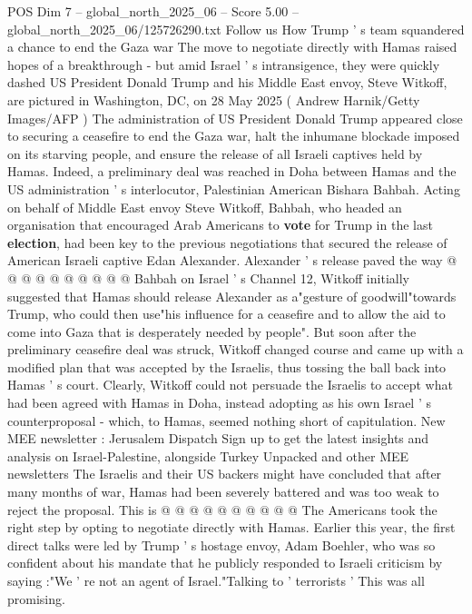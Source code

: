 \begin{textsample}{POS Dim 7 – global\_north\_2025\_06 – Score 5.00 – global\_north\_2025\_06/125726290.txt}  \label{ex:f7_pos_383}
Follow us How Trump ' s team squandered a chance to end the Gaza war The move to negotiate directly with Hamas raised hopes of a breakthrough - but amid Israel ' s intransigence, they were quickly dashed US President Donald Trump and his Middle East envoy, Steve Witkoff, are pictured in Washington, DC, on 28 May 2025 ( Andrew Harnik/Getty Images/AFP ) The administration of US President Donald Trump appeared close to securing a ceasefire to end the Gaza war, halt the inhumane blockade imposed on its starving people, and ensure the release of all Israeli captives held by Hamas.
Indeed, a preliminary deal was reached in Doha between Hamas and the US administration ' s interlocutor, Palestinian American Bishara Bahbah.
Acting on behalf of Middle East envoy Steve Witkoff, Bahbah, who headed an organisation that encouraged Arab Americans to \textbf{vote} for Trump in the last \textbf{election}, had been key to the previous negotiations that secured the release of American Israeli captive Edan Alexander.
Alexander ' s release paved the way @ @ @ @ @ @ @ @ @ @ Bahbah on Israel ' s Channel 12, Witkoff initially suggested that Hamas should release Alexander as a"gesture of goodwill"towards Trump, who could then use"his influence for a ceasefire and to allow the aid to come into Gaza that is desperately needed by people".
But soon after the preliminary ceasefire deal was struck, Witkoff changed course and came up with a modified plan that was accepted by the Israelis, thus tossing the ball back into Hamas ' s court.
Clearly, Witkoff could not persuade the Israelis to accept what had been agreed with Hamas in Doha, instead adopting as his own Israel ' s counterproposal - which, to Hamas, seemed nothing short of capitulation.
New MEE newsletter : Jerusalem Dispatch Sign up to get the latest insights and analysis on Israel-Palestine, alongside Turkey Unpacked and other MEE newsletters The Israelis and their US backers might have concluded that after many months of war, Hamas had been severely battered and was too weak to reject the proposal.
This is @ @ @ @ @ @ @ @ @ @ The Americans took the right step by opting to negotiate directly with Hamas.
Earlier this year, the first direct talks were led by Trump ' s hostage envoy, Adam Boehler, who was so confident about his mandate that he publicly responded to Israeli criticism by saying :"We ' re not an agent of Israel."Talking to ' terrorists ' This was all promising.

\end{textsample}
